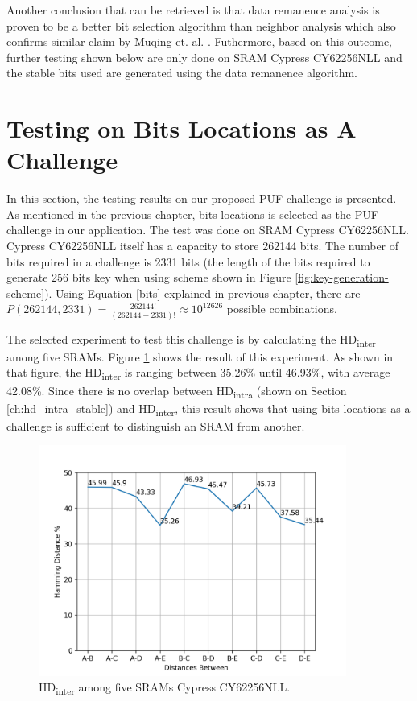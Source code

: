 Another conclusion that can be retrieved is that data remanence analysis is proven to be a better bit selection algorithm than neighbor analysis which also confirms similar claim by Muqing et. al. \cite{liu_zhou_tang_parhi_kim_2017}. Futhermore, based on this outcome, further testing shown below are only done on SRAM Cypress CY62256NLL and the stable bits used are generated using the data remanence algorithm.

\section{Testing on Bits Locations as A Challenge}
In this section, the testing results on our proposed PUF challenge is presented. As mentioned in the previous chapter, bits locations is selected as the PUF challenge in our application. The test was done on SRAM Cypress CY62256NLL. Cypress CY62256NLL itself has a capacity to store 262144 bits. The number of bits required in a challenge is 2331 bits (the length of the bits required to generate 256 bits key when using scheme shown in Figure \ref{fig:key-generation-scheme}). Using Equation \ref{bits} explained in previous chapter, there are $P(262144, 2331)=\frac{262144!}{\left( 262144-2331 \right) !}\approx 10^{12626}$ possible combinations.

The selected experiment to test this challenge is by calculating the HD\textsubscript{inter} among five SRAMs. Figure \ref{fig:cy62256cy62256nll_hd_inter_stable_remanences} shows the result of this experiment. As shown in that figure, the HD\textsubscript{inter} is ranging between 35.26\% until 46.93\%, with average 42.08\%. Since there is no overlap between HD\textsubscript{intra} (shown on Section \ref{ch:hd_intra_stable}) and HD\textsubscript{inter}, this result shows that using bits locations as a challenge is sufficient to distinguish an SRAM from another.

\begin{figure}[tph!]
    \centerline{\includegraphics[width={0.9\textwidth}]{images/cy62256nll_hd_inter_stable_remanences}}
    \caption{HD\textsubscript{inter} among five SRAMs Cypress CY62256NLL. }
    \label{fig:cy62256cy62256nll_hd_inter_stable_remanences}
\end{figure}

